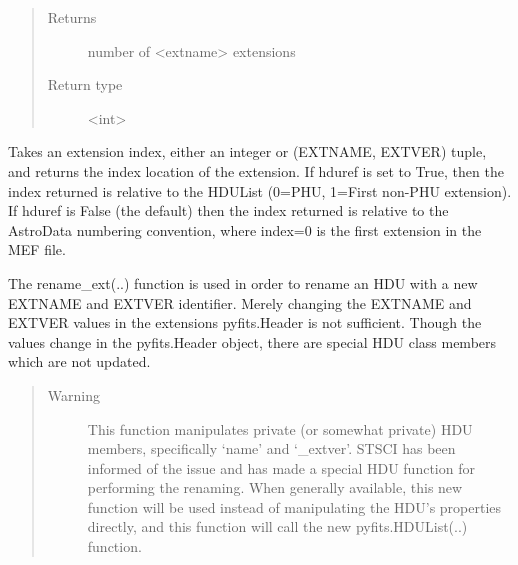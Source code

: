 \documentclass[letterpaper,10pt,english]{sphinxmanual}
\begin{document}
\begin{fulllineitems}
\begin{fulllineitems}
\begin{quote}
\begin{description}
\item[{Returns}] \leavevmode
number of \textless{}extname\textgreater{} extensions

\item[{Return type}] \leavevmode
\textless{}int\textgreater{}

\end{description}\end{quote}

\end{fulllineitems}


\begin{fulllineitems}
\label{astro_class:astrodata.AstroData.AstroData.ext_index}
Takes an extension index, either an integer or (EXTNAME, EXTVER) 
tuple, and returns the index location of the extension.  If hduref is 
set to True, then the index returned is relative to the HDUList 
(0=PHU, 1=First non-PHU extension). If hduref is False (the default) 
then the index returned is relative to the AstroData numbering 
convention, where index=0 is the first extension in the MEF file.

\end{fulllineitems}


\begin{fulllineitems}
\label{astro_class:astrodata.AstroData.AstroData.rename_ext}
The rename\_ext(..) function is used in order to rename an 
HDU with a new EXTNAME and EXTVER identifier.  Merely changing 
the EXTNAME and EXTVER values in the extensions pyfits.Header 
is not sufficient. Though the values change in the pyfits.Header 
object, there are special HDU class members which are not updated.
\begin{quote}\begin{description}
\item[{Warning }] \leavevmode
This function manipulates private (or somewhat private) 
HDU members, specifically `name' and `\_extver'. STSCI 
has been informed of the issue and has made a special 
HDU function for performing the renaming. 
When generally available, this new function will be used 
instead of manipulating the  HDU's properties directly, 
and this function will call the new pyfits.HDUList(..) 
function.


\end{description}
\end{quote}
\end{fulllineitems}
\end{fulllineitems}
\end{document}
